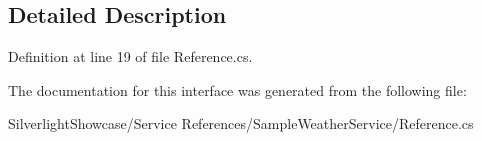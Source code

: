 \subsection{Detailed Description}


Definition at line 19 of file Reference.cs.

The documentation for this interface was generated from the following file:\begin{DoxyCompactItemize}
\item 
SilverlightShowcase/Service References/SampleWeatherService/Reference.cs\end{DoxyCompactItemize}
